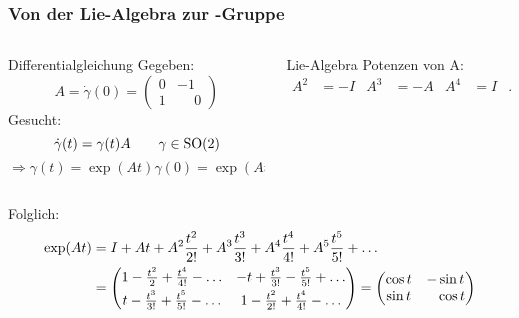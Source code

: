 \begin{frame}[t]
\setlength{\abovedisplayskip}{5pt}
\setlength{\belowdisplayskip}{5pt}
\frametitle{Von der Lie-Algebra zur -Gruppe}
\vspace{-20pt}
\begin{columns}[t,onlytextwidth]
\begin{column}{0.48\textwidth}
  \begin{block}{Differentialgleichung}
    Gegeben:
    \[
    A
    =
    \dot\gamma(0) = \begin{pmatrix} 0 & -1 \\ 1 & \phantom-0 \end{pmatrix}
    \]
    Gesucht:
    \[ \dot \gamma (t) = \gamma(t) A \qquad \gamma \in \text{SO}(2) \]
    \[ \Rightarrow \gamma(t) = \exp(At) \gamma(0) = \exp(At) \]
  \end{block}
\end{column}
\begin{column}{0.48\textwidth}
  \begin{block}{Lie-Algebra}
    Potenzen von A:
    \begin{align*}
      A^2 &= -I &
      A^3 &= -A &
      A^4 &=  I &
      \ldots
    \end{align*}
  \end{block}
\end{column}
\end{columns}
Folglich:
\begin{align*}
  \exp(At)
  &= I + At 
  + A^2\frac{t^2}{2!} 
  + A^3\frac{t^3}{3!}
  + A^4\frac{t^4}{4!}
  + A^5\frac{t^5}{5!}
  + \ldots \\
  &= \begin{pmatrix}
    \vspace*{3pt}
    1 - \frac{t^2}{2} + \frac{t^4}{4!} - \ldots
    &
    -t + \frac{t^3}{3!} - \frac{t^5}{5!} + \ldots
    \\ 
    t - \frac{t^3}{3!} + \frac{t^5}{5!} - \ldots
    &
    1 - \frac{t^2}{2!} + \frac{t^4}{4!} - \ldots
  \end{pmatrix}
  =
  \begin{pmatrix}
    \cos t &         -\sin t \\ 
    \sin t & \phantom-\cos t
  \end{pmatrix}
\end{align*}

\end{frame}
\egroup
